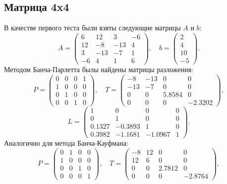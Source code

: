\documentclass[a4paper, 12pt]{article}   	%
\begin{document}
\subsection{Матрица 4x4}
В качестве первого теста были взяты следующие матрицы $A$ и $b$:
\begin{equation*}
    A = 
    \left(\begin{array}{cccc} 
    6  & 12 & 3  & -6 \\ 
    12 & -8 & -13 & 4 \\ 
    3 & -13 & -7 & 1 \\ 
    -6 & 4 & 1 & 6  
    \end{array}\right),
    \quad 
    b = 
    \left(\begin{array}{c}
    2 \\
    4 \\
    10 \\
    -5
     \end{array}\right).
\end{equation*}
Методом Банча-Парлетта былы найдены матрицы разложения:
\begin{equation*}
    P = 
    \left(\begin{array}{cccc} 
    0 & 0 & 0 & 1 \\ 
    1 & 0 & 0 & 0 \\ 
    0 & 1 & 0 & 0 \\ 
    0 & 0 & 1 & 0  
    \end{array}\right),
    \quad 
    T = 
    \left(\begin{array}{cccc} 
    -8 & -13 & 0 & 0 \\ 
    -13 & -7 & 0 & 0 \\ 
    0 & 0 & 5.8584 & 0 \\ 
    0 & 0 & 0 & -2.3202  
    \end{array}\right),
\end{equation*}
\begin{equation*}
    L = 
    \left(\begin{array}{cccc} 
    1 & 0 & 0 & 0 \\ 
    0 & 1 & 0 & 0 \\ 
    0.1327 & -0.3893 & 1 & 0 \\ 
    0.3982 & -1.1681 & -1.0967 & 1
    \end{array}\right).
\end{equation*}
Аналогично для метода Банча-Кауфмана:
\begin{equation*}
    P = 
    \left(\begin{array}{cccc} 
    0 & 1 & 0 & 0 \\ 
    1 & 0 & 0 & 0 \\ 
    0 & 0 & 1 & 0 \\ 
    0 & 0 & 0 & 1  
    \end{array}\right),
    \quad 
    T = 
    \left(\begin{array}{cccc} 
    -8 & 12 & 0 & 0 \\ 
    12 & 6 & 0 & 0 \\ 
    0 & 0 & 2.7812 & 0 \\ 
    0 & 0 & 0 & -2.8764  
    \end{array}\right),
\end{equation*}
\end{document}
